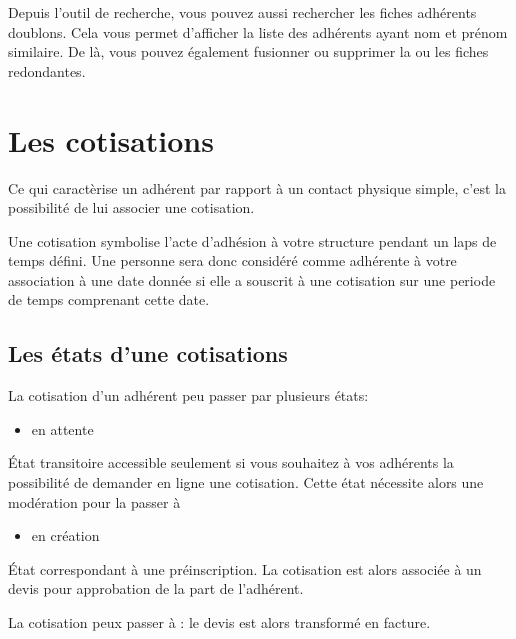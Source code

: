 \documentclass[a4paper,10pt,oneside,french]{sphinxmanual}
\begin{document}
Depuis l’outil de recherche, vous pouvez aussi rechercher les fiches adhérents doublons. Cela vous permet d’afficher la liste des adhérents ayant nom et prénom similaire.
De là, vous pouvez également fusionner ou supprimer la ou les fiches redondantes.


\section{Les cotisations}
\label{\detokenize{member/subscription:les-cotisations}}\label{\detokenize{member/subscription::doc}}
Ce qui caractèrise un adhérent par rapport à un contact physique simple, c’est la possibilité de lui associer une cotisation.

Une cotisation symbolise l’acte d’adhésion à votre structure pendant un laps de temps défini.
Une personne sera donc considéré comme adhérente à votre association à une date donnée si elle a souscrit à une cotisation sur une periode de temps comprenant cette date.


\subsection{Les états d’une cotisations}
\label{\detokenize{member/subscription:les-etats-d-une-cotisations}}
La cotisation d’un adhérent peu passer par plusieurs états:
\begin{itemize}
\item {} 
en attente

\end{itemize}

État transitoire accessible seulement si vous souhaitez à vos adhérents la possibilité de demander en ligne une cotisation.
Cette état nécessite alors une modération pour la passer à 
\begin{itemize}
\item {} 
en création

\end{itemize}

État correspondant à une préinscription.
La cotisation est alors associée à un devis pour approbation de la part de l’adhérent.

La cotisation peux passer à : le devis est alors transformé en facture.
\end{document}
